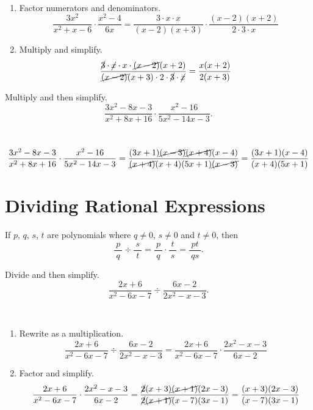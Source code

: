 \documentclass[en,12pt]{elegantbook}
\let\BeginKnitrBlock\begin \let\EndKnitrBlock\end
\begin{document}
\BeginKnitrBlock{solution}
{}\\

\begin{enumerate}
\def\labelenumi{\arabic{enumi}.}
\item
  Factor numerators and denominators.
  \[
   \dfrac{3x^2}{x^2+x-6}\cdot\dfrac{x^2-4}{6x}=\dfrac{3\cdot x\cdot x}{(x-2)(x+3)}\cdot\dfrac{(x-2)(x+2)}{2\cdot3\cdot x}
  \]
\item
  Multiply and simplify.
  \[
   \dfrac{\cancel{3}\cdot \cancel{x}\cdot x\cdot\cancel{(x-2)}(x+2)}{\cancel{(x-2)}(x+3)\cdot 2\cdot\cancel{3}\cdot \cancel{x}}=\dfrac{x(x+2)}{2(x+3)}
  \]
\end{enumerate}
\EndKnitrBlock{solution}

\BeginKnitrBlock{example}
\protect\hypertarget{exm:unnamed-chunk-47}{}{\label{exm:unnamed-chunk-47} }
Multiply and then simplify.
\[
\dfrac{3x^2-8x-3}{x^2+8x+16}\cdot\dfrac{x^2-16}{5x^2-14x-3}.
\]
\EndKnitrBlock{example}

\BeginKnitrBlock{solution}
{}\\

\[
\dfrac{3x^2-8x-3}{x^2+8x+16}\cdot\dfrac{x^2-16}{5x^2-14x-3}
=\dfrac{(3x+1)\cancel{(x-3)}\cancel{(x+4)}(x-4)}{\cancel{(x+4)}(x+4)(5x+1)\cancel{(x-3)}}
=\dfrac{(3x+1)(x-4)}{(x+4)(5x+1)}
\]
\EndKnitrBlock{solution}

\hypertarget{dividing-rational-expressions}{%
\section{Dividing Rational Expressions}\label{dividing-rational-expressions}}

If \(p\), \(q\), \(s\), \(t\) are polynomials where \(q\neq 0\), \(s\neq 0\) and \(t\neq 0\), then
\[
\dfrac{~p~}{~q~}\div\dfrac{~s~}{~t~}=\dfrac{~p~}{~q~}\cdot\dfrac{~t~}{~s~}=\dfrac{~pt~}{~qs~}.
\]

\BeginKnitrBlock{example}
\protect\hypertarget{exm:unnamed-chunk-49}{}{\label{exm:unnamed-chunk-49} }
Divide and then simplify.\\
\[
\dfrac{2x+6}{x^2-6x-7}\div \dfrac{6x-2}{2x^2-x-3}.
\]
\EndKnitrBlock{example}

\BeginKnitrBlock{solution}
{}\\

\begin{enumerate}
\def\labelenumi{\arabic{enumi}.}
\item
  Rewrite as a multiplication.\\
  \[
  \dfrac{2x+6}{x^2-6x-7}\div \dfrac{6x-2}{2x^2-x-3}=\dfrac{2x+6}{x^2-6x-7}\cdot \dfrac{2x^2-x-3}{6x-2}
  \]
\item
  Factor and simplify.\\
  \[
  \dfrac{2x+6}{x^2-6x-7}\cdot\dfrac{2x^2-x-3}{6x-2}
  =\dfrac{\cancel{2}(x+3)\cancel{(x+1)}(2x-3)}{\cancel{2}\cancel{(x+1)}(x-7)(3x-1)}
  =\dfrac{(x+3)(2x-3)}{(x-7)(3x-1)}
  \]
\end{enumerate}
\EndKnitrBlock{solution}
\end{document}
